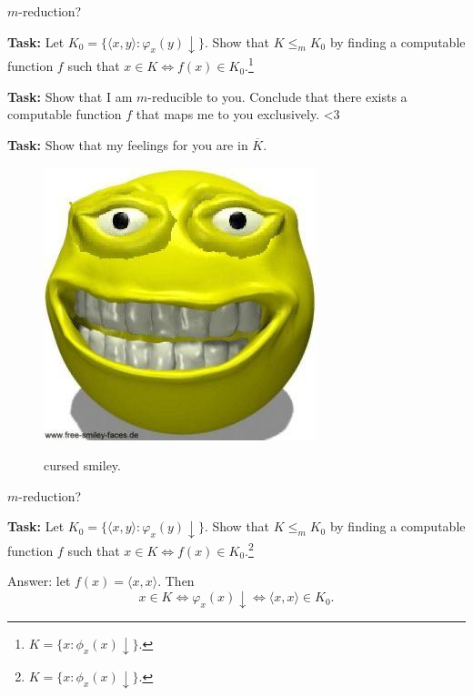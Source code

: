 \documentclass{beamer}
\begin{document}
\begin{frame}{$m$-reduction? \emojiflushed}

\textbf{Task:} Let $K_0 = \{\langle x, y \rangle: \varphi_x(y) \downarrow\}$. Show that $K \leq_m K_0$ by finding a computable function $f$ such that $x \in K \Leftrightarrow f(x) \in K_0$.\footnote{$K = \{x: \phi_x(x) \downarrow\}$.}

\vspace{2mm}

{\color{red} \textbf{Task:} Show that I am $m$-reducible to you. Conclude that there exists a computable function $f$ that maps me to you exclusively. \textless 3}

\vspace{2mm}

{\color{red} \textbf{Task:} Show that my feelings for you are in $\overline{K}$. }

\begin{figure}[h]
\centering
\includegraphics[scale=0.3]{img/free_smiley.jpg}

cursed smiley.
\end{figure}

\end{frame}

\begin{frame}{$m$-reduction? \emojiflushed}

\textbf{Task:} Let $K_0 = \{\langle x, y \rangle: \varphi_x(y) \downarrow\}$. Show that $K \leq_m K_0$ by finding a computable function $f$ such that $x \in K \Leftrightarrow f(x) \in K_0$.\footnote{$K = \{x: \phi_x(x) \downarrow\}$.}

\vspace{2mm}

Answer: let $f(x) = \langle x, x \rangle$. Then
$$x \in K \Leftrightarrow \varphi_x(x) \downarrow \Leftrightarrow \langle x, x \rangle \in K_0.$$

\end{frame}
\end{document}
